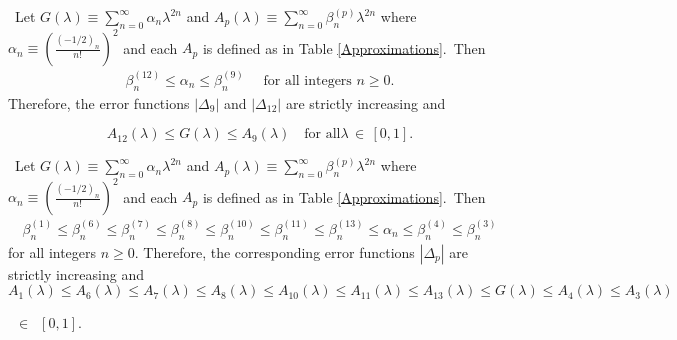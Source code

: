 \documentclass[final,oneeqnum]{siamltex}
\begin{document}
\begin{proposition}
\label{prop1}%
\ Let $G(\lambda)
\equiv \sum_{n=0}^{\infty}\alpha_{n}\lambda^{2n} $ and
 $A_{p}(\lambda) \equiv 
\sum_{n=0}^{\infty}\beta^{(p)}_{n}\lambda^{2n}$
 where
$\alpha_{n} \equiv   (\frac{(-1/2)_{n}}{n!})^2$ and each
$A_{p}$ is
defined as in Table {\rm\ref{Approximations}}.\ Then
\begin{eqnarray}
 \beta^{(12)}_{n}\leq \alpha_{n} \leq \beta^{(9)}_{n}\quad \mbox{ for all
integers $n
\geq 0$.}  \nonumber
\end{eqnarray} Therefore, the error functions $|\Delta_{9}|$  and
$|\Delta_{12}|$ are
strictly increasing and
\end{proposition}
\[
 A_{12}(\lambda) \leq G(\lambda)\leq A_{9}(\lambda) \quad \mbox{for all
$\lambda$}
 \,\in \,[0,1].
\]

\begin{proposition}
\label{prop2}%
\ Let $G(\lambda) \equiv
\sum_{n=0}^{\infty}\alpha_{n}\lambda^{2n} $ and
 $A_{p}(\lambda) \equiv
\sum_{n=0}^{\infty}\beta^{(p)}_{n}\lambda^{2n}$
 where
$\alpha_{n} \equiv (\frac{(-1/2)_{n}}{n!})^2$ and each
$A_{p}$ is
defined as in Table {\rm\ref{Approximations}}.\ Then
\begin{eqnarray}
 \beta^{(1)}_{n}\leq \beta^{(6)}_{n}\leq \beta^{(7)}_{n}\leq
\beta^{(8)}_{n}\leq
\beta^{(10)}_{n} \leq \beta^{(11)}_{n}\leq \beta^{(13)}_{n}\leq \alpha_{n}
\leq\beta^{(4)}_{n}\leq\beta^{(3)}_{n}  \nonumber
\end{eqnarray} 
\noindent for all integers $n \geq 0$. 
Therefore, the corresponding error functions $|\Delta_{p}|$ are
strictly increasing and
\[
 A_{1}(\lambda) \leq A_{6}(\lambda) \leq A_{7}(\lambda) \leq A_{8}(\lambda)
 \leq A_{10}(\lambda) \leq A_{11}(\lambda) \leq
A_{13}(\lambda) \leq G(\lambda)\leq  A_{4}(\lambda) \leq  A_{3}(\lambda) 
\]

   \, $\in$ \,$[0,1]$.
\end{proposition}
\end{document}
